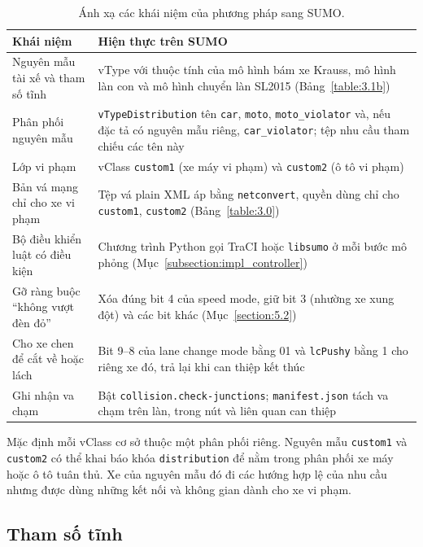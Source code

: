 \documentclass[../main.tex]{subfiles}
\begin{document}
\begin{table}[!htbp]
\centering
\small
\caption{Ánh xạ các khái niệm của phương pháp sang SUMO.}
\label{table:impl_map}
\begin{tabular}{|>{\raggedright\arraybackslash}p{4.2cm}|>{\raggedright\arraybackslash}p{9.8cm}|}
\hline
\textbf{Khái niệm} & \textbf{Hiện thực trên SUMO} \\ \hline
Nguyên mẫu tài xế và tham số tĩnh & vType với thuộc tính của mô hình bám xe Krauss, mô hình làn con và mô hình chuyển làn SL2015 (Bảng~\ref{table:3.1b}) \\ \hline
Phân phối nguyên mẫu & \texttt{vTypeDistribution} tên \texttt{car}, \texttt{moto}, \texttt{moto\_violator} và, nếu đặc tả có nguyên mẫu riêng, \texttt{car\_violator}; tệp nhu cầu tham chiếu các tên này \\ \hline
Lớp vi phạm & vClass \texttt{custom1} (xe máy vi phạm) và \texttt{custom2} (ô tô vi phạm) \\ \hline
Bản vá mạng chỉ cho xe vi phạm & Tệp vá plain XML áp bằng \texttt{netconvert}, quyền dùng chỉ cho \texttt{custom1}, \texttt{custom2} (Bảng~\ref{table:3.0}) \\ \hline
Bộ điều khiển luật có điều kiện & Chương trình Python gọi TraCI hoặc \texttt{libsumo} ở mỗi bước mô phỏng (Mục~\ref{subsection:impl_controller}) \\ \hline
Gỡ ràng buộc ``không vượt đèn đỏ'' & Xóa đúng bit 4 của speed mode, giữ bit 3 (nhường xe xung đột) và các bit khác (Mục~\ref{section:5.2}) \\ \hline
Cho xe chen để cắt về hoặc lách & Bit 9--8 của lane change mode bằng 01 và \texttt{lcPushy} bằng 1 cho riêng xe đó, trả lại khi can thiệp kết thúc \\ \hline
Ghi nhận va chạm & Bật \texttt{collision.check-junctions}; \texttt{manifest.json} tách va chạm trên làn, trong nút và liên quan can thiệp \\ \hline
\end{tabular}
\end{table}

Mặc định mỗi vClass cơ sở thuộc một phân phối riêng. Nguyên mẫu \texttt{custom1} và \texttt{custom2} có thể khai báo khóa \texttt{distribution} để nằm trong phân phối xe máy hoặc ô tô tuân thủ. Xe của nguyên mẫu đó đi các hướng hợp lệ của nhu cầu nhưng được dùng những kết nối và không gian dành cho xe vi phạm.

\subsection{Tham số tĩnh}
\end{document}
